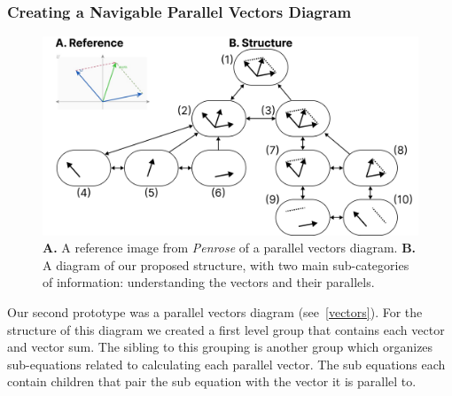 \documentclass[journal]{vgtc}                %
\begin{document}

\subsubsection{Creating a Navigable Parallel Vectors Diagram}
\begin{figure}[h]
  \centering
  \includegraphics[width=\linewidth]{figures/vectors.png}
  \caption{\textbf{A.} A reference image from \textit{Penrose} of a parallel vectors diagram. \textbf{B.} A diagram of our proposed structure, with two main sub-categories of information: understanding the vectors and their parallels.}
  \label{vectors}
\end{figure}

Our second prototype was a parallel vectors diagram (see~\autoref{vectors}). For the structure of this diagram we created a first level group that contains each vector and vector sum. The sibling to this grouping is another group which organizes sub-equations related to calculating each parallel vector. The sub equations each contain children that pair the sub equation with the vector it is parallel to.
\end{document}
